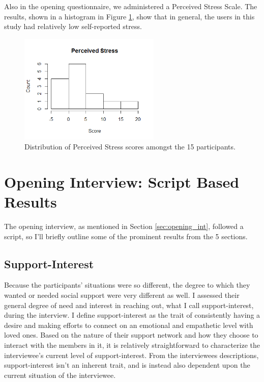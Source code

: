   Also in the opening questionnaire, we administered a Perceived Stress Scale.
  The results, shown in a histogram in Figure \ref{fig:perceived_stress},
  show that in general, the users in this study had relatively low
  self-reported stress.

    \begin{figure}
    \centering
    \includegraphics[width=0.6\textwidth]{perceived_stress.png}
    \caption[Perceived Stress]{
      Distribution of Perceived Stress scores amongst the 15 participants.
    }
    \label{fig:perceived_stress}
    \end{figure}

\section{Opening Interview: Script Based Results}
  The opening interview, as mentioned in Section \ref{sec:opening_int},
  followed a script, so I'll briefly outline some of the
  prominent results from the 5 sections.

  \subsection{Support-Interest}
  Because the participants' situations were so different,
  the degree to which they wanted or needed social support were very different as well.
  I assessed their general degree of need and interest in reaching out,
  what I call support-interest, during the interview.
  I define support-interest as the trait of consistently having a desire
  and making efforts to
  connect on an emotional and empathetic level with loved ones.
  Based on the nature of their support network
  and how they choose to interact with the members in it,
  it is relatively straightforward to characterize the interviewee's
  current level of support-interest.
  From the interviewees descriptions, support-interest isn't an inherent trait,
  and is instead also dependent upon the current situation of the interviewee.

